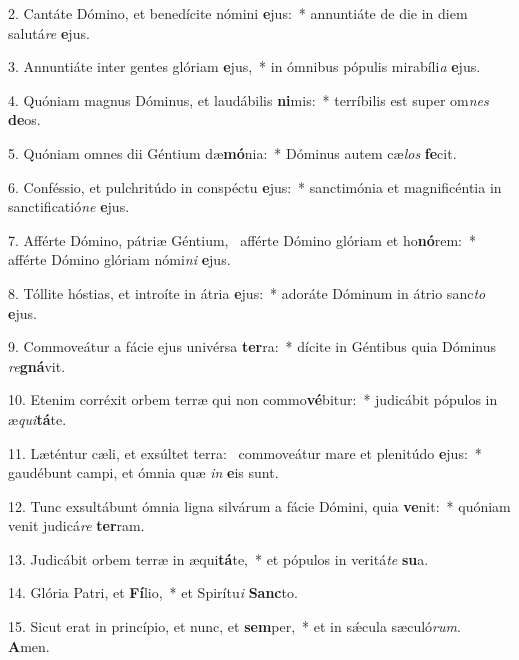 2. Cantáte Dómino, et benedícite nómini \textbf{e}jus:~*  annuntiáte de die in diem salutá\textit{re} \textbf{e}jus.\

3. Annuntiáte inter gentes glóriam \textbf{e}jus,~*  in ómnibus pópulis mirabíli\textit{a} \textbf{e}jus.\

4. Quóniam magnus Dóminus, et laudábilis \textbf{ni}mis:~*  terríbilis est super om\textit{nes} \textbf{de}os.\

5. Quóniam omnes dii Géntium dæ\textbf{mó}nia:~*  Dóminus autem cæ\textit{los} \textbf{fe}cit.\

6. Conféssio, et pulchritúdo in conspéctu \textbf{e}jus:~*  sanctimónia et magnificéntia in sanctificatió\textit{ne} \textbf{e}jus.\

7. Afférte Dómino, pátriæ Géntium, \dag\  afférte Dómino glóriam et ho\textbf{nó}rem:~*  afférte Dómino glóriam nómi\textit{ni} \textbf{e}jus.\

8. Tóllite hóstias, et introíte in átria \textbf{e}jus:~*  adoráte Dóminum in átrio sanc\textit{to} \textbf{e}jus.\

9. Commoveátur a fácie ejus univérsa \textbf{ter}ra:~*  dícite in Géntibus quia Dóminus \textit{re}\textbf{gná}vit.\

10. Etenim corréxit orbem terræ qui non commo\textbf{vé}bitur:~*  judicábit pópulos in æ\textit{qui}\textbf{tá}te.\

11. Læténtur cæli, et exsúltet terra: \dag\  commoveátur mare et plenitúdo \textbf{e}jus:~*  gaudébunt campi, et ómnia quæ \textit{in} \textbf{e}is sunt.\

12. Tunc exsultábunt ómnia ligna silvárum a fácie Dómini, quia \textbf{ve}nit:~*  quóniam venit judicá\textit{re} \textbf{ter}ram.\

13. Judicábit orbem terræ in æqui\textbf{tá}te,~*  et pópulos in veritá\textit{te} \textbf{su}a.\

14. Glória Patri, et \textbf{Fí}lio,~*  et Spirítu\textit{i} \textbf{Sanc}to.\

15. Sicut erat in princípio, et nunc, et \textbf{sem}per,~*  et in sǽcula sæculó\textit{rum}. \textbf{A}men.\

